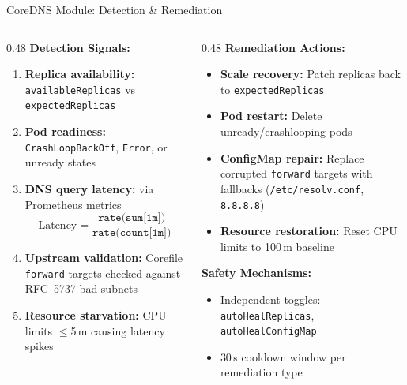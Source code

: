 \documentclass[aspectratio=169, 11pt]{beamer}
\begin{document}
\begin{frame}{CoreDNS Module: Detection \& Remediation}

\begin{columns}[T]
\begin{column}{0.48\textwidth}
\footnotesize
\textbf{Detection Signals:}
\begin{enumerate}
  \item \textbf{Replica availability:} \texttt{availableReplicas} vs \texttt{expectedReplicas}
  \item \textbf{Pod readiness:} \texttt{CrashLoopBackOff}, \texttt{Error}, or unready states
  \item \textbf{DNS query latency:} via Prometheus metrics
  \[
    \text{Latency} = \frac{\texttt{rate(sum[1m])}}{\texttt{rate(count[1m])}}
  \]
  \item \textbf{Upstream validation:} Corefile \texttt{forward} targets checked against RFC~5737 bad subnets
  \item \textbf{Resource starvation:} CPU limits $\leq$5\,m causing latency spikes
\end{enumerate}
\end{column}

\begin{column}{0.48\textwidth}
\footnotesize
\textbf{Remediation Actions:}
\begin{itemize}
  \item \textbf{Scale recovery:} Patch replicas back to \texttt{expectedReplicas}
  \item \textbf{Pod restart:} Delete unready/crashlooping pods
  \item \textbf{ConfigMap repair:} Replace corrupted \texttt{forward} targets with fallbacks (\texttt{/etc/resolv.conf}, \texttt{8.8.8.8})
  \item \textbf{Resource restoration:} Reset CPU limits to 100\,m baseline
\end{itemize}

\vspace{4pt}
\textbf{Safety Mechanisms:}
\begin{itemize}
  \item Independent toggles: \texttt{autoHealReplicas}, \texttt{autoHealConfigMap}
  \item 30\,s cooldown window per remediation type
\end{itemize}
\end{column}
\end{columns}

\end{frame}
\end{document}
